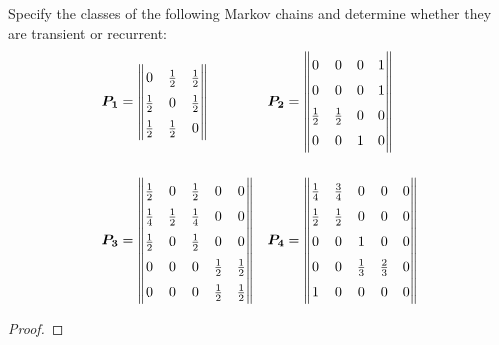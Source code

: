 \begin{problem}{4.14}
  Specify the classes of the following Markov chains and determine whether they
  are transient or recurrent:
  \begin{align*}
    \renewcommand\arraystretch{1.5}
    \begin{array}{ll}
      \boldsymbol{P_1} =
      \begin{Vmatrix}
        0           & \frac{1}{2} & \frac{1}{2} \\
        \frac{1}{2} & 0           & \frac{1}{2} \\
        \frac{1}{2} & \frac{1}{2} & 0 \\
      \end{Vmatrix}
      &
      \boldsymbol{P_2} =
      \begin{Vmatrix}
        0           & 0           & 0           & 1 \\
        0           & 0           & 0           & 1 \\
        \frac{1}{2} & \frac{1}{2} & 0           & 0 \\
        0           & 0           & 1           & 0\\
      \end{Vmatrix} \\\\
      \boldsymbol{P_3} =
      \begin{Vmatrix}
        \frac{1}{2} & 0           & \frac{1}{2} & 0           & 0           \\
        \frac{1}{4} & \frac{1}{2} & \frac{1}{4} & 0           & 0           \\
        \frac{1}{2} & 0           & \frac{1}{2} & 0           & 0           \\
        0           & 0           & 0           & \frac{1}{2} & \frac{1}{2} \\
        0           & 0           & 0           & \frac{1}{2} & \frac{1}{2} \\
      \end{Vmatrix}
      &
      \boldsymbol{P_4} =
      \begin{Vmatrix}
        \frac{1}{4} & \frac{3}{4} & 0           & 0           & 0           \\
        \frac{1}{2} & \frac{1}{2} & 0           & 0           & 0           \\
        0           & 0           & 1           & 0           & 0           \\
        0           & 0           & \frac{1}{3} & \frac{2}{3} & 0           \\
        1           & 0           & 0           & 0           & 0           \\
      \end{Vmatrix}
    \end{array}
  \end{align*}
\end{problem}

\begin{proof}
\end{proof}
\newpage
